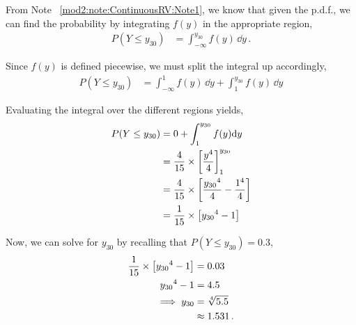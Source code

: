 \begin{subquestions}
\begin{subsubquestions}
From Note ~\ref{mod2:note:ContinuousRV:Note1}, we know that given the p.d.f., we can find the probability by integrating $f(y)$ in the appropriate region,
\begin{align}
	P(Y \leq y_{30}) &= \int_{-\infty}^{y_{30}} f(y) \,\dd y \,.
\end{align}

Since $f(y)$ is defined piecewise, we must split the integral up accordingly,
\begin{align}
P(Y \leq y_{30}) &= \int_{-\infty}^1 f(y) \, \dd y + \int_{1}^{y_{30}} f(y) \,\dd y
\end{align}

Evaluating the integral over the different regions yields,
\begin{align}
	P(Y \leq y_{30}) & = 0 +  \int_{1}^{y_{30}} f(y)\mathrm{d}y  \nonumber \\
	                   &=\frac{4}{15} \times \left[\frac{y^4}{4}\right]^{{y_{30}}}_1 \nonumber \\
	                   &= \frac{4}{15} \times \left[\frac{{y_{30}}^4}{4} - \frac{1^4}{4}\right]  \nonumber \\
	                   &= \frac{1}{15} \times \left[{y_{30}}^4 - 1\right]   
\end{align}

Now, we can solve for $y_{30}$ by recalling that $P(Y \leq y_{30}) = 0.3$,
\begin{align}                 
	\frac{1}{15} \times \left[{y_{30}}^4 - 1\right] &= 0.03 \nonumber \\
	                                  {y_{30}}^4 -1 & = 4.5 \nonumber \\
	                   \implies {y_{30}} & = \sqrt[4]{5.5} \nonumber \\
	                                     & \approx 1.531 \,.             
\end{align}

\end{subsubquestions}
	
\end{subquestions}


